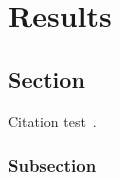 
\chapter{Results}\label{chapter:results}

\section{Section}
Citation test~\parencite{latex}.
\subsection{Subsection}